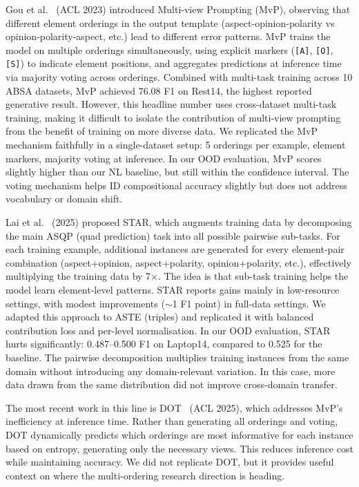 \documentclass[12pt,a4paper]{report}
\begin{document}
Gou et al.~\cite{gou2023mvp} (ACL 2023) introduced Multi-view Prompting (MvP), observing that different element orderings in the output template (aspect-opinion-polarity vs opinion-polarity-aspect, etc.) lead to different error patterns. MvP trains the model on multiple orderings simultaneously, using explicit markers (\texttt{[A]}, \texttt{[O]}, \texttt{[S]}) to indicate element positions, and aggregates predictions at inference time via majority voting across orderings. Combined with multi-task training across 10 ABSA datasets, MvP achieved 76.08 F1 on Rest14, the highest reported generative result. However, this headline number uses cross-dataset multi-task training, making it difficult to isolate the contribution of multi-view prompting from the benefit of training on more diverse data. We replicated the MvP mechanism faithfully in a single-dataset setup: 5 orderings per example, element markers, majority voting at inference. In our OOD evaluation, MvP scores slightly higher than our NL baseline, but still within the confidence interval. The voting mechanism helps ID compositional accuracy slightly but does not address vocabulary or domain shift.

Lai et al.~\cite{xie2025star} (2025) proposed STAR, which augments training data by decomposing the main ASQP (quad prediction) task into all possible pairwise sub-tasks. For each training example, additional instances are generated for every element-pair combination (aspect+opinion, aspect+polarity, opinion+polarity, etc.), effectively multiplying the training data by 7$\times$. The idea is that sub-task training helps the model learn element-level patterns. STAR reports gains mainly in low-resource settings, with modest improvements ($\sim$1 F1 point) in full-data settings. We adapted this approach to ASTE (triples) and replicated it with balanced contribution loss and per-level normalisation. In our OOD evaluation, STAR hurts significantly: 0.487--0.500 F1 on Laptop14, compared to 0.525 for the baseline. The pairwise decomposition multiplies training instances from the same domain without introducing any domain-relevant variation. In this case, more data drawn from the same distribution did not improve cross-domain transfer.

The most recent work in this line is DOT~\cite{dot2025} (ACL 2025), which addresses MvP's inefficiency at inference time. Rather than generating all orderings and voting, DOT dynamically predicts which orderings are most informative for each instance based on entropy, generating only the necessary views. This reduces inference cost while maintaining accuracy. We did not replicate DOT, but it provides useful context on where the multi-ordering research direction is heading.
\end{document}
